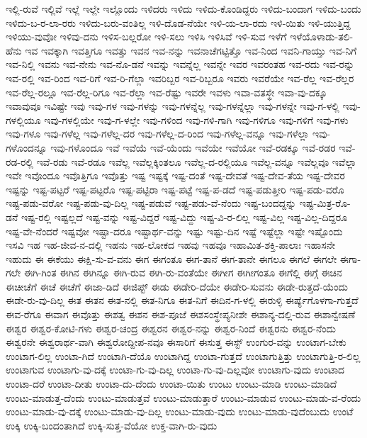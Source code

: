 ಇಲ್ಲಿ-ರುವೆ
ಇಲ್ಲಿವೆ
ಇಲ್ಲೆ
ಇಲ್ಲೇ
ಇಲ್ಲೊಂದು
ಇಳಿದರು
ಇಳಿದು
ಇಳಿದು-ಕೊಂಡಿದ್ದರು
ಇಳಿದು-ಬಂದಾಗ
ಇಳಿದು-ಬಂದು
ಇಳಿದು-ಬ-ರ-ಲಾ-ರರು
ಇಳಿದು-ಬರು-ವಂತಿಲ್ಲ
ಇಳಿ-ದೊಡ-ನೆಯೇ
ಇಳಿ-ಯ-ಲಾ-ರದು
ಇಳಿ-ಯಿತು
ಇಳಿ-ಯುತ್ತಿದ್ದ
ಇಳಿಯು-ವುವೋ
ಇಳಿವು-ದನು
ಇಳಿಸ-ಬಲ್ಲರೋ
ಇಳಿ-ಸಲು
ಇಳಿಸಿ
ಇಳಿಸಿವೆ
ಇಳಿ-ಸುವ
ಇಳೆಗೆ
ಇಳೆಯೊಳಾಡು-ತಲಿ-ಹೆನು
ಇವ
ಇವಕ್ಕಾಗಿ
ಇವತ್ತಿಗೂ
ಇವತ್ತು
ಇವನ
ಇವ-ನನ್ನು
ಇವನಾಚೆಗಟ್ಟಿತ್ತೊ
ಇವ-ನಿಂದ
ಇವನಿ-ಗಾಯ್ತು
ಇವ-ನಿಗೆ
ಇವ-ನಿಲ್ಲಿ
ಇವನು
ಇವ-ನೇನು
ಇವ-ನೊ-ಡನೆ
ಇವನ್ನು
ಇವನ್ನೆಲ್ಲ
ಇವನ್ನೇ
ಇವರ
ಇವರಂತಹ
ಇವ-ರದು
ಇವ-ರನ್ನು
ಇವ-ರಲ್ಲಿ
ಇವ-ರಿಂದ
ಇವ-ರಿಗೆ
ಇವ-ರಿ-ಗೆಲ್ಲಾ
ಇವರಿಬ್ಬರ
ಇವ-ರಿಬ್ಬರೂ
ಇವರು
ಇವರೆಯೇ
ಇವ-ರೆಲ್ಲ
ಇವ-ರೆಲ್ಲರ
ಇವ-ರೆಲ್ಲ-ರಲ್ಲೂ
ಇವ-ರೆಲ್ಲ-ರಿಗೂ
ಇವ-ರೆಲ್ಲಾ
ಇವ-ರೆಷ್ಟು
ಇವರೇ
ಇವಳು
ಇವಾ-ವತಸ್ಥೇ
ಇವಾ-ವು-ದಕ್ಕೂ
ಇವಾವುವೂ
ಇವಿಷ್ಟೇ
ಇವು
ಇವು-ಗಳ
ಇವು-ಗಳನ್ನು
ಇವು-ಗಳನ್ನೆಲ್ಲ
ಇವು-ಗಳನ್ನೆಲ್ಲಾ
ಇವು-ಗಳನ್ನೇ
ಇವು-ಗ-ಳಲ್ಲಿ
ಇವು-ಗಳಲ್ಲಿಯೂ
ಇವು-ಗಳಲ್ಲಿಯೇ
ಇವು-ಗ-ಳಲ್ಲೇ
ಇವು-ಗಳಿಂದ
ಇವು-ಗಳಿ-ಗಾಗಿ
ಇವು-ಗಳಿಗೂ
ಇವು-ಗಳಿಗೆ
ಇವು-ಗಳು
ಇವು-ಗಳೂ
ಇವು-ಗಳೆಲ್ಲ
ಇವು-ಗಳೆಲ್ಲ-ದರ
ಇವು-ಗಳೆಲ್ಲ-ದ-ರಿಂದ
ಇವು-ಗಳೆಲ್ಲ-ವನ್ನೂ
ಇವು-ಗಳೆಲ್ಲಾ
ಇವು-ಗಳೊಂದನ್ನೂ
ಇವು-ಗಳೊಂದೂ
ಇವೆ
ಇವೆಯೆ
ಇವೆ-ಯೆಂದು
ಇವೆಯೇ
ಇವೆಯೋ
ಇವೆ-ರಡಕ್ಕೂ
ಇವೆ-ರಡರ
ಇವೆ-ರಡ-ರಲ್ಲಿ
ಇವೆ-ರಡು
ಇವೆ-ರಡೂ
ಇವೆಲ್ಲ
ಇವೆಲ್ಲಕ್ಕಿಂತಲೂ
ಇವೆಲ್ಲ-ದ-ರಲ್ಲಿಯೂ
ಇವೆಲ್ಲ-ವನ್ನೂ
ಇವೆಲ್ಲವೂ
ಇವೆಲ್ಲಾ
ಇವೇ
ಇವೊಂದೂ
ಇವೊತ್ತಿಗೂ
ಇವೊತ್ತು
ಇಷ್ಟ
ಇಷ್ಟಕ್ಕೆ
ಇಷ್ಟ-ದಂತೆ
ಇಷ್ಟ-ದೇವತೆ
ಇಷ್ಟ-ದೇವ-ತೆಯ
ಇಷ್ಟ-ದೇವರ
ಇಷ್ಟನ್ನು
ಇಷ್ಟ-ಪಟ್ಟರೆ
ಇಷ್ಟ-ಪಟ್ಟರೊ
ಇಷ್ಟ-ಪಟ್ಟಿರಾ
ಇಷ್ಟ-ಪಟ್ಟೆ
ಇಷ್ಟ-ಪ-ಡದೆ
ಇಷ್ಟ-ಪಡುತ್ತೀರಿ
ಇಷ್ಟ-ಪಡು-ವರೊ
ಇಷ್ಟ-ಪಡು-ವರೋ
ಇಷ್ಟ-ಪಡು-ವು-ದಿಲ್ಲ
ಇಷ್ಟ-ಪಡುವೆ
ಇಷ್ಟ-ಪಡು-ವೆ-ನೆಂದು
ಇಷ್ಟ-ಬಂದದ್ದನ್ನು
ಇಷ್ಟ-ಮಿತ್ರ-ರೊ-ಡನೆ
ಇಷ್ಟ-ರಲ್ಲಿ
ಇಷ್ಟಲ್ಲದೆ
ಇಷ್ಟ-ವನ್ನು
ಇಷ್ಟ-ವಿದ್ದರೆ
ಇಷ್ಟ-ವಿದ್ದು
ಇಷ್ಟ-ವಿ-ರ-ಲಿಲ್ಲ
ಇಷ್ಟ-ವಿಲ್ಲ
ಇಷ್ಟ-ವಿಲ್ಲ-ದಿದ್ದರೂ
ಇಷ್ಟ-ವೇ-ನೆಂದರೆ
ಇಷ್ಟವೋ
ಇಷ್ಟಾ-ದರೂ
ಇಷ್ಟಾರ್ಥ-ವನ್ನು
ಇಷ್ಟು
ಇಷ್ಟು-ದಿನ
ಇಷ್ಟೆ
ಇಷ್ಟೆಲ್ಲಾ
ಇಷ್ಟೇ
ಇಷ್ಟೊಂದು
ಇಸವಿ
ಇಹ
ಇಹ-ಜೀವ-ನ-ದಲ್ಲಿ
ಇಹನು
ಇಹ-ಲೋಕದ
ಇಹವು
ಇಹವೂ
ಇಹಾಮಿತ-ಶಕ್ತಿ-ಪಾಲಾಃ
ಇಹಾಸನೇ
ಇಹುದು
ಈ
ಈಕೆಯು
ಈಕ್ಷಿ-ಸು-ವ-ವನು
ಈಗ
ಈಗಂತೂ
ಈಗ-ತಾನೆ
ಈಗ-ತಾನೇ
ಈಗಲೂ
ಈಗಲೆ
ಈಗಲೇ
ಈಗಾ-ಗಲೇ
ಈಗಿ-ಗಿಂತ
ಈಗಿನ
ಈಗಿನ್ನೂ
ಈಗಿ-ರುವ
ಈಗಿ-ರು-ವಂತೆಯೇ
ಈಗೀಗ
ಈಗೀಗಂತೂ
ಈಗೆಲ್ಲಿ
ಈಗ್ಗೆ
ಈಚಿನ
ಈಚೀಚೆಗೆ
ಈಚೆ
ಈಚೆಗೆ
ಈಜಾ-ಡಿದೆ
ಈಜಿಪ್ಟ್
ಈಡು
ಈಡೇರಿ-ದೆಯೇ
ಈಡೇರಿ-ಸುವನು
ಈಡೇ-ರುತ್ತದೆ-ಯೆಂದು
ಈಡೇ-ರು-ವು-ದಿಲ್ಲ
ಈತ
ಈತನ
ಈತ-ನಲ್ಲಿ
ಈತ-ನಿಗೂ
ಈತ-ನಿಗೆ
ಈದಿನ-ಗ-ಳಲ್ಲಿ
ಈರುಳ್ಳಿ
ಈರ್ಷ್ಯೆಗೊಳಗಾ-ಗುತ್ತದೆ
ಈವ-ರೆಗೂ
ಈವಾಗ
ಈವೊತ್ತು
ಈಶತ್ವ
ಈಶನ
ಈಶ-ಪೂಜೆ
ಈಶಸಂಸ್ಥೇಪ್ಯನೀಶೇ
ಈಶಾನ್ಯ-ದಲ್ಲಿ-ರುವ
ಈಶಾನ್ವೇಷಣೆ
ಈಶ್ವರ
ಈಶ್ವರ-ಕೋಟಿ-ಗಳು
ಈಶ್ವರ-ಚಂದ್ರ
ಈಶ್ವರನ
ಈಶ್ವರ-ನನ್ನು
ಈಶ್ವರ-ನಿಂದೆ
ಈಶ್ವರನು
ಈಶ್ವರ-ನೆಂದು
ಈಶ್ವರನೇ
ಈಶ್ವರಾರ್ಥ-ವಾಗಿ
ಈಶ್ವರೋದ್ದೀಪ-ನವೂ
ಈಸಾರಿಗೆ
ಈಸುತ್ತ
ಈಸ್ಟ್
ಉಂಗುರ-ವನ್ನು
ಉಂಟಾಗ-ಬೇಕು
ಉಂಟಾಗ-ಲಿಲ್ಲ
ಉಂಟಾ-ಗಿದೆ
ಉಂಟಾಗಿ-ದೆಯೊ
ಉಂಟಾಗಿದ್ದ
ಉಂಟಾ-ಗುತ್ತದೆ
ಉಂಟಾಗುತ್ತಿತ್ತು
ಉಂಟಾಗುತ್ತಿ-ರ-ಲಿಲ್ಲ
ಉಂಟಾಗುವ
ಉಂಟಾಗು-ವು-ದಕ್ಕೆ
ಉಂಟಾ-ಗು-ವು-ದಿಲ್ಲ
ಉಂಟಾ-ಗು-ವು-ದಿಲ್ಲವೋ
ಉಂಟಾಗು-ವುದು
ಉಂಟಾದ
ಉಂಟಾ-ದರೆ
ಉಂಟಾ-ದೀತು
ಉಂಟಾ-ದು-ದೆಂದು
ಉಂಟಾ-ಯಿತು
ಉಂಟು
ಉಂಟು-ಮಾಡಿ
ಉಂಟು-ಮಾಡಿದೆ
ಉಂಟು-ಮಾಡುತ್ತ-ದೆಂದು
ಉಂಟು-ಮಾಡುತ್ತವೆ
ಉಂಟು-ಮಾಡುತ್ತಾರೆ
ಉಂಟು-ಮಾಡುವ
ಉಂಟು-ಮಾಡು-ವ-ರೆಂದು
ಉಂಟು-ಮಾಡು-ವು-ದಕ್ಕೆ
ಉಂಟು-ಮಾಡು-ವು-ದಿಲ್ಲ
ಉಂಟು-ಮಾಡು-ವುದು
ಉಂಟು-ಮಾಡು-ವುದೆಂಬುದು
ಉಂಟೆ
ಉಕ್ಕಿ
ಉಕ್ಕಿ-ಬಂದಂತಾಗಿದೆ
ಉಕ್ಕಿ-ಸುತ್ತ-ವೆಯೋ
ಉಕ್ತ-ವಾಗಿ-ರು-ವುದು
